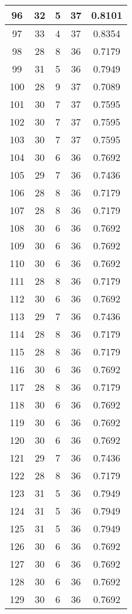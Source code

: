\documentclass[letterpaper, 12pt]{article}
\begin{document}
\begin{longtable}{|c|c|c|c|c|}
\hline
96 & 32 & 5 & 37 & 0.8101 \\
\hline
97 & 33 & 4 & 37 & 0.8354 \\
\hline
98 & 28 & 8 & 36 & 0.7179 \\
\hline
99 & 31 & 5 & 36 & 0.7949 \\
\hline
100 & 28 & 9 & 37 & 0.7089 \\
\hline
101 & 30 & 7 & 37 & 0.7595 \\
\hline
102 & 30 & 7 & 37 & 0.7595 \\
\hline
103 & 30 & 7 & 37 & 0.7595 \\
\hline
104 & 30 & 6 & 36 & 0.7692 \\
\hline
105 & 29 & 7 & 36 & 0.7436 \\
\hline
106 & 28 & 8 & 36 & 0.7179 \\
\hline
107 & 28 & 8 & 36 & 0.7179 \\
\hline
108 & 30 & 6 & 36 & 0.7692 \\
\hline
109 & 30 & 6 & 36 & 0.7692 \\
\hline
110 & 30 & 6 & 36 & 0.7692 \\
\hline
111 & 28 & 8 & 36 & 0.7179 \\
\hline
112 & 30 & 6 & 36 & 0.7692 \\
\hline
113 & 29 & 7 & 36 & 0.7436 \\
\hline
114 & 28 & 8 & 36 & 0.7179 \\
\hline
115 & 28 & 8 & 36 & 0.7179 \\
\hline
116 & 30 & 6 & 36 & 0.7692 \\
\hline
117 & 28 & 8 & 36 & 0.7179 \\
\hline
118 & 30 & 6 & 36 & 0.7692 \\
\hline
119 & 30 & 6 & 36 & 0.7692 \\
\hline
120 & 30 & 6 & 36 & 0.7692 \\
\hline
121 & 29 & 7 & 36 & 0.7436 \\
\hline
122 & 28 & 8 & 36 & 0.7179 \\
\hline
123 & 31 & 5 & 36 & 0.7949 \\
\hline
124 & 31 & 5 & 36 & 0.7949 \\
\hline
125 & 31 & 5 & 36 & 0.7949 \\
\hline
126 & 30 & 6 & 36 & 0.7692 \\
\hline
127 & 30 & 6 & 36 & 0.7692 \\
\hline
128 & 30 & 6 & 36 & 0.7692 \\
\hline
129 & 30 & 6 & 36 & 0.7692 \\

\end{longtable}
\end{document}
